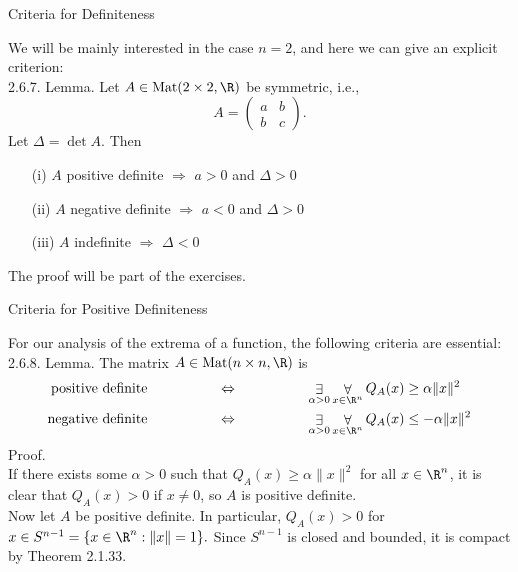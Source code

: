 \documentclass[smaller,hyperref={CJKbookmarks=true}]{beamer}
\begin{document}
\begin{frame}[t]{Criteria for Definiteness}
\begin{spacing}{1.05}
We will be mainly interested in the case $n = 2$, and here we can give an
explicit criterion:\\[5pt]
\alert{2.6.7. Lemma.} Let $A\in\text{Mat}(2\times 2,\R)$ be symmetric, i.e.,
\[A=\begin{pmatrix}
      a & b \\
      b & c
    \end{pmatrix}.\]
Let $\Delta=\det A$. Then
\begin{itemize}
  \item[(i)] $A$ positive definite $\Rightarrow$ $a>0$ and $\Delta>0$
  \item[(ii)] $A$ negative definite $\Rightarrow$ $a<0$ and $\Delta>0$
  \item[(iii)] $A$ indefinite $\Rightarrow$ $\Delta<0$
\end{itemize}
\vspace*{10pt}
The proof will be part of the exercises.
\end{spacing}
\end{frame}
\begin{frame}[t]{Criteria for Positive Definiteness}
\begin{spacing}{1.05}
For our analysis of the extrema of a function, the following criteria are
essential:\\[5pt]
\alert{2.6.8. Lemma.} The matrix $A\in\text{Mat}(n\times n,\R)$ is
\begin{align*}
  \text{positive definite}\qquad\qquad\quad &\Leftrightarrow\qquad\qquad\quad
  \mathop{\exists}_{\alpha>0}\mathop{\forall}_{x\in\R^n}
  Q_A(x)\geq\alpha\|x\|^2 \\
  \text{negative definite}\qquad\qquad\quad &\Leftrightarrow\qquad\qquad\quad
  \mathop{\exists}_{\alpha>0}\mathop{\forall}_{x\in\R^n}Q_A(x)\leq-\alpha\|x\|^2
\end{align*}
\alert{Proof.}\\
If there exists some $\alpha>0$ such that $Q_A(x)\geq\alpha\|x\|^2$ for all $x\in\R^n$, it is clear that $Q_A(x)>0$ if $x\neq0$, so $A$ is positive definite.\\[5pt]
Now let $A$ be positive definite. In particular, $Q_A(x)>0$ for $x\in S^{n-1}=\{x\in\R^n:\|x\|=1\}.$ Since $S^{n-1}$ is closed and bounded, it is compact by Theorem 2.1.33.
\end{spacing}
\end{frame}
\end{document}

